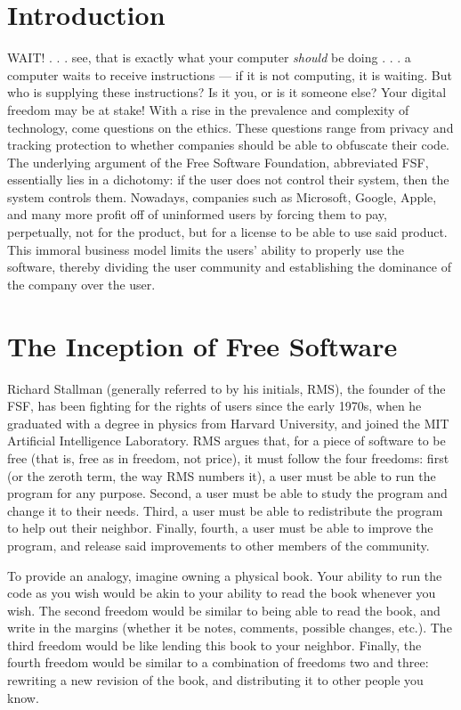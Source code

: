 \documentclass[12pt]{article}
\begin{document}
\begin{multicols}{3}

  \section*{\small Introduction}

  WAIT! . . . see, that is exactly what your computer \textit{should} be doing . . . a computer waits to receive instructions — if it is not computing, it is waiting. But who is supplying these instructions? Is it you, or is it someone else? Your digital freedom may be at stake! With a rise in the prevalence and complexity of technology, come questions on the ethics. These questions range from privacy and tracking protection to whether companies should be able to obfuscate their code. The underlying argument of the Free Software Foundation, abbreviated FSF, essentially lies in a dichotomy: if the user does not control their system, then the system controls them. Nowadays, companies such as Microsoft, Google, Apple, and many more profit off of uninformed users by forcing them to pay, perpetually, not for the product, but for a license to be able to use said product. This immoral business model limits the users' ability to properly use the software, thereby dividing the user community and establishing the dominance of the company over the user. 

  \section*{\small The Inception of Free Software}

  Richard Stallman (generally referred to by his initials, RMS), the founder of the FSF, has been fighting for the rights of users since the early 1970s, when he graduated with a degree in physics from Harvard University, and joined the MIT Artificial Intelligence Laboratory.  RMS argues that, for a piece of software to be free (that is, free as in freedom, not price), it must follow the four freedoms: first (or the zeroth term, the way RMS numbers it), a user must be able to run the program for any purpose. Second, a user must be able to study the program and change it to their needs. Third, a user must be able to redistribute the program to help out their neighbor. Finally, fourth, a user must be able to improve the program, and release said improvements to other members of the community. 

  To provide an analogy, imagine owning a physical book. Your ability to run the code as you wish would be akin to your ability to read the book whenever you wish. The second freedom would be similar to being able to read the book, and write in the margins (whether it be notes, comments, possible changes, etc.). The third freedom would be like lending this book to your neighbor. Finally, the fourth freedom would be similar to a combination of freedoms two and three: rewriting a new revision of the book, and distributing it to other people you know.


\end{multicols}
\end{document}
